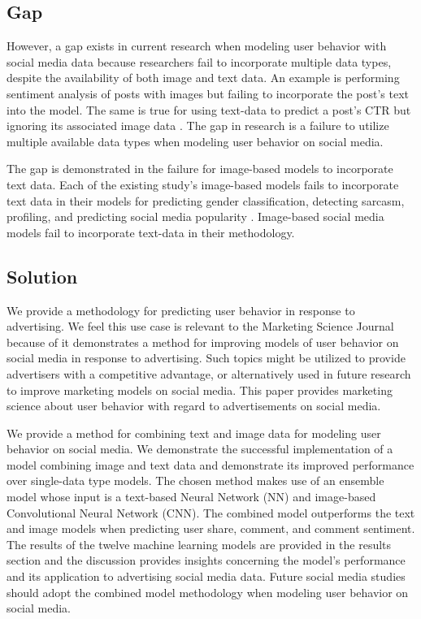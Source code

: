 \documentclass[mksc,blindrev]{informs3} %
\begin{document}
\subsection{Gap}

However, a gap exists in current research when modeling user behavior with social media data because researchers fail to incorporate multiple data types, despite the availability of both image and text data. An example is performing sentiment analysis of posts with images \cite{Wang2015} but failing to incorporate the post's text into the model. The same is true for using text-data to predict a post's CTR but ignoring its associated image data \cite{Li2015}. The gap in research is a failure to utilize multiple available data types when modeling user behavior on social media.

The gap is demonstrated in the failure for image-based models to incorporate text data. Each of the existing study's image-based models fails to incorporate text data in their models for predicting gender classification, detecting sarcasm, profiling, and predicting social media popularity \cite{Hassner2015, Poria2016, Segalin2017, Gelli2015}. Image-based social media models fail to incorporate text-data in their methodology.

\subsection{Solution}

We provide a methodology for predicting user behavior in response to advertising. We feel this use case is relevant to the Marketing Science Journal because of it demonstrates a method for improving models of user behavior on social media in response to advertising. Such topics might be utilized to provide advertisers with a competitive advantage, or alternatively used in future research to improve marketing models on social media. This paper provides marketing science about user behavior with regard to advertisements on social media.
  
We provide a method for combining text and image data for modeling user behavior on social media. We demonstrate the successful implementation of a model combining image and text data and demonstrate its improved performance over single-data type models. The chosen method makes use of an ensemble model whose input is a text-based Neural Network (NN) and image-based Convolutional Neural Network (CNN). The combined model outperforms the text and image models when predicting user share, comment, and comment sentiment. The results of the twelve machine learning models are provided in the results section and the discussion provides insights concerning the model's performance and its application to advertising social media data. Future social media studies should adopt the combined model methodology when modeling user behavior on social media.
\end{document}

